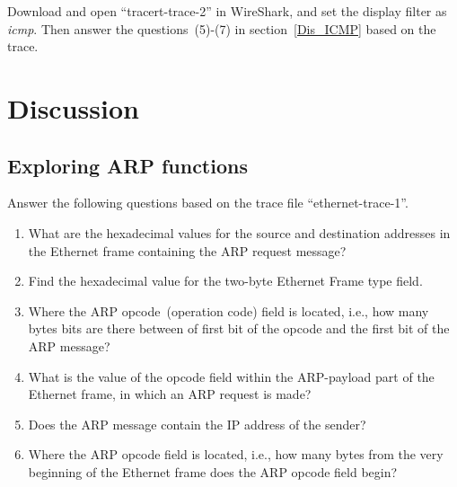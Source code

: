 \noindent Download and open ``tracert-trace-2'' in WireShark, and set the display filter as \textit{icmp}. Then answer the questions~(5)-(7) in section~\ref{Dis_ICMP} based on the trace.

\section{Discussion}

\subsection{Exploring ARP functions}\label{Dis_ARP}
\noindent  Answer the following questions based on the trace file ``ethernet-trace-1''.

\begin{enumerate}

\item What are the hexadecimal values for the source and destination addresses in the Ethernet frame containing the ARP request message?

\item Find the hexadecimal value for the two-byte Ethernet Frame type field. 



\item  Where the ARP opcode~(operation code) field is located, i.e., how many bytes bits are there between of first bit of the opcode and the first bit of the ARP message?

\item What is the value of the opcode field within the ARP-payload part of the Ethernet frame, in which an ARP request is made?

\item Does the ARP message contain the IP address of the sender?
   

\item Where the ARP opcode field is located, i.e., how many bytes from the very beginning of the Ethernet frame does the ARP opcode field begin?


\end{enumerate}
